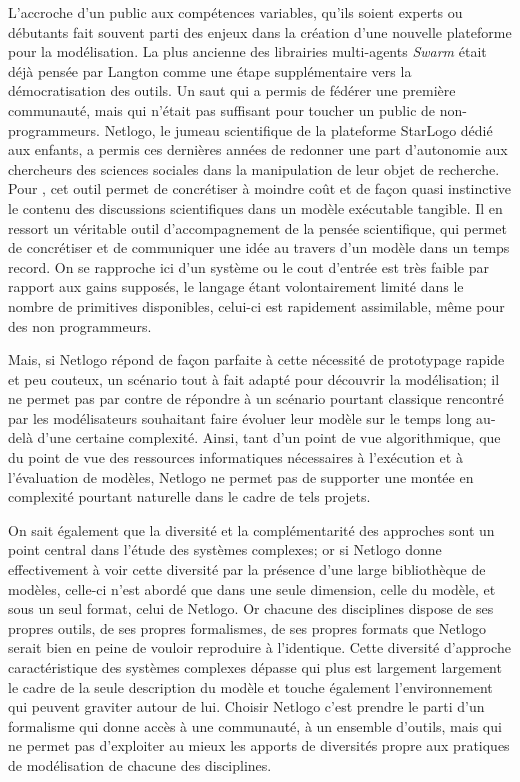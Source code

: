L'accroche d'un public aux compétences variables, qu'ils soient experts ou débutants fait souvent parti des enjeux dans la création d'une nouvelle plateforme pour la modélisation. La plus ancienne des librairies multi-agents \textit{Swarm} était déjà pensée par Langton comme une étape supplémentaire vers la démocratisation des outils. Un saut qui a permis de fédérer une première communauté, mais qui n'était pas suffisant pour toucher un public de non-programmeurs. Netlogo, le jumeau scientifique de la plateforme StarLogo dédié aux enfants, a permis ces dernières années de redonner une part d'autonomie aux chercheurs des sciences sociales dans la manipulation de leur objet de recherche. Pour \textcite{Banos2013}, cet outil permet de concrétiser à moindre coût et de façon quasi instinctive le contenu des discussions scientifiques dans un modèle exécutable tangible. Il en ressort un véritable outil d'accompagnement de la pensée scientifique, qui permet de concrétiser et de communiquer une idée au travers d'un modèle dans un temps record. On se rapproche ici d'un système ou le cout d'entrée est très faible par rapport aux gains supposés, le langage étant volontairement limité dans le nombre de primitives disponibles, celui-ci est rapidement assimilable, même pour des non programmeurs. 

Mais, si Netlogo répond de façon parfaite à cette nécessité de prototypage rapide et peu couteux, un scénario tout à fait adapté pour découvrir la modélisation; il ne permet pas par contre de répondre à un scénario pourtant classique rencontré par les modélisateurs souhaitant faire évoluer leur modèle sur le temps long au-delà d'une certaine complexité. Ainsi, tant d'un point de vue algorithmique, que du point de vue des ressources informatiques nécessaires à l'exécution et à l'évaluation de modèles, Netlogo ne permet pas de supporter une montée en complexité pourtant naturelle dans le cadre de tels projets. 

On sait également que la diversité et la complémentarité des approches sont un point central dans l'étude des systèmes complexes; or si Netlogo donne effectivement à voir cette diversité par la présence d'une large bibliothèque de modèles, celle-ci n'est abordé que dans une seule dimension, celle du modèle, et sous un seul format, celui de Netlogo. Or chacune des disciplines dispose de ses propres outils, de ses propres formalismes, de ses propres formats que Netlogo serait bien en peine de vouloir reproduire à l'identique. Cette diversité d'approche caractéristique des systèmes complexes dépasse qui plus est largement largement le cadre de la seule description du modèle et touche également l'environnement qui peuvent graviter autour de lui. Choisir Netlogo c'est prendre le parti d'un formalisme qui donne accès à une communauté, à un ensemble d'outils, mais qui ne permet pas d'exploiter au mieux les apports de diversités propre aux pratiques de modélisation de chacune des disciplines. 

